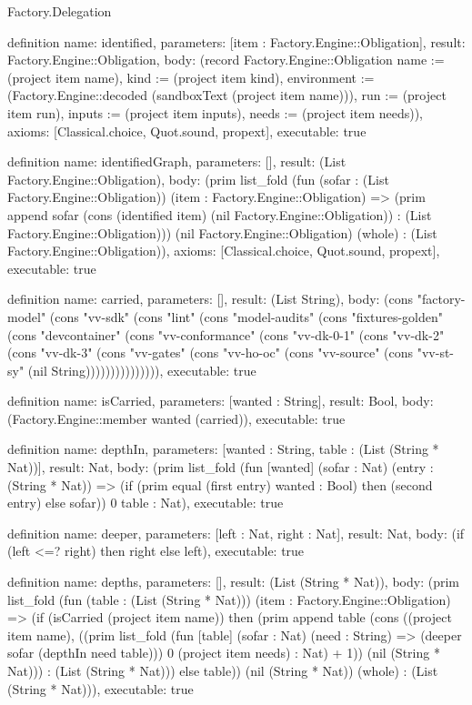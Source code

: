 \begin{lexlean}{Factory.Delegation}
\begin{semanticmodule}
definition{
  name: identified,
  parameters: [item : Factory.Engine::Obligation],
  result: Factory.Engine::Obligation,
  body: (record Factory.Engine::Obligation {name := (project item name), kind := (project item kind), environment := (Factory.Engine::decoded (sandboxText (project item name))), run := (project item run), inputs := (project item inputs), needs := (project item needs)}),
  axioms: [Classical.choice, Quot.sound, propext],
  executable: true
}

definition{
  name: identifiedGraph,
  parameters: [],
  result: (List Factory.Engine::Obligation),
  body: (prim list_fold (fun (sofar : (List Factory.Engine::Obligation)) (item : Factory.Engine::Obligation) => (prim append sofar (cons (identified item) (nil Factory.Engine::Obligation)) : (List Factory.Engine::Obligation))) (nil Factory.Engine::Obligation) (whole) : (List Factory.Engine::Obligation)),
  axioms: [Classical.choice, Quot.sound, propext],
  executable: true
}

definition{
  name: carried,
  parameters: [],
  result: (List String),
  body: (cons "factory-model" (cons "vv-sdk" (cons "lint" (cons "model-audits" (cons "fixtures-golden" (cons "devcontainer" (cons "vv-conformance" (cons "vv-dk-0-1" (cons "vv-dk-2" (cons "vv-dk-3" (cons "vv-gates" (cons "vv-ho-oc" (cons "vv-source" (cons "vv-st-sy" (nil String))))))))))))))),
  executable: true
}

definition{
  name: isCarried,
  parameters: [wanted : String],
  result: Bool,
  body: (Factory.Engine::member wanted (carried)),
  executable: true
}

definition{
  name: depthIn,
  parameters: [wanted : String, table : (List (String * Nat))],
  result: Nat,
  body: (prim list_fold (fun [wanted] (sofar : Nat) (entry : (String * Nat)) => (if (prim equal (first entry) wanted : Bool) then (second entry) else sofar)) 0 table : Nat),
  executable: true
}

definition{
  name: deeper,
  parameters: [left : Nat, right : Nat],
  result: Nat,
  body: (if (left <=? right) then right else left),
  executable: true
}

definition{
  name: depths,
  parameters: [],
  result: (List (String * Nat)),
  body: (prim list_fold (fun (table : (List (String * Nat))) (item : Factory.Engine::Obligation) => (if (isCarried (project item name)) then (prim append table (cons ((project item name), ((prim list_fold (fun [table] (sofar : Nat) (need : String) => (deeper sofar (depthIn need table))) 0 (project item needs) : Nat) + 1)) (nil (String * Nat))) : (List (String * Nat))) else table)) (nil (String * Nat)) (whole) : (List (String * Nat))),
  executable: true
}


\end{semanticmodule}
\end{lexlean}
